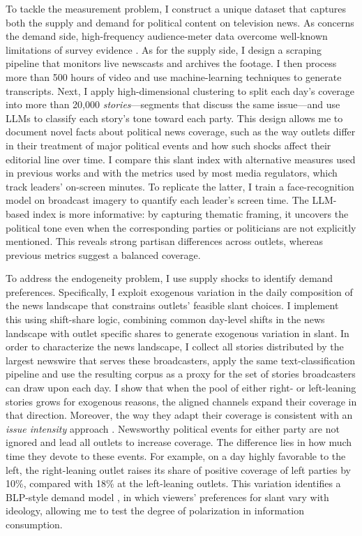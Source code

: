 \documentclass[12pt]{article}
\begin{document}
To tackle the measurement problem, I construct a unique dataset that captures both the supply and demand for political content on television news. As concerns the demand side, high-frequency audience-meter data overcome well-known limitations of survey evidence \citep{prior}. As for the supply side, I design a scraping pipeline that monitors live newscasts and archives the footage. I then process more than 500 hours of video and use machine-learning techniques to generate transcripts. Next, I apply high-dimensional clustering to split each day’s coverage into more than 20,000 \emph{stories}—segments that discuss the same issue—and use LLMs to classify each story’s tone toward each party.  This design allows me to document novel facts about political news coverage, such as the way outlets differ in their treatment of major political events and how such shocks affect their editorial line over time. I compare this slant index with alternative measures used in previous works and with the metrics used by most media regulators, which track leaders’ on-screen minutes. To replicate the latter, I train a face-recognition model on broadcast imagery to quantify each leader’s screen time. The LLM-based index is more informative: by capturing thematic framing, it uncovers the political tone even when  the corresponding parties or politicians are not explicitly mentioned. This reveals strong partisan differences across outlets, whereas previous metrics suggest a balanced coverage.





To address the endogeneity problem, I use supply shocks to identify demand preferences. Specifically, I exploit exogenous variation in the daily composition of the news landscape  that  constrains outlets’ feasible slant choices. I implement this using shift-share logic, combining common day-level shifts in the news landscape with outlet specific shares to generate exogenous variation in slant. In order to characterize the news landscape, I collect all stories distributed by the largest newswire that serves these broadcasters, apply the same text-classification pipeline and use the resulting corpus as  a proxy for the set of stories broadcasters can draw upon each day. I show that  when the pool of either right- or left-leaning  stories grows for exogenous reasons, the aligned channels expand  their coverage in that direction. Moreover, the way they adapt their coverage is consistent with  an \emph{issue intensity} approach \citep{puglisi_review}. Newsworthy political events for either party are not ignored and lead all outlets to increase coverage. The difference lies in how much time they devote to these events. For example, on a day highly favorable to the left, the right-leaning outlet raises its share of positive coverage of left parties by 10\%, compared with 18\% at the left-leaning outlets. This variation identifies a BLP-style demand model \citep{berry_blp}, in which viewers’ preferences for slant vary with ideology, allowing me to test the degree of polarization in information consumption.
\end{document}
